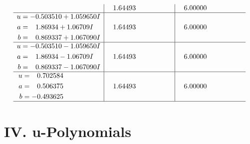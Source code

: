 \documentclass[1p]{elsarticle_modified}
\theoremstyle{definition}
\begin{document}
$$\begin{array}{c|c|c}
 & \phantom{-}1.64493\phantom{ +0.000000I} & \phantom{-}6.00000\phantom{ +0.000000I} \\ \hline\begin{aligned}
u &= -0.503510 + 1.059650 I \\
a &= \phantom{-}1.86934 + 1.06709 I \\
b &= \phantom{-}0.869337 + 1.067090 I\end{aligned}
 & \phantom{-}1.64493\phantom{ +0.000000I} & \phantom{-}6.00000\phantom{ +0.000000I} \\ \hline\begin{aligned}
u &= -0.503510 - 1.059650 I \\
a &= \phantom{-}1.86934 - 1.06709 I \\
b &= \phantom{-}0.869337 - 1.067090 I\end{aligned}
 & \phantom{-}1.64493\phantom{ +0.000000I} & \phantom{-}6.00000\phantom{ +0.000000I} \\ \hline\begin{aligned}
u &= \phantom{-}0.702584\phantom{ +0.000000I} \\
a &= \phantom{-}0.506375\phantom{ +0.000000I} \\
b &= -0.493625\phantom{ +0.000000I}\end{aligned}
 & \phantom{-}1.64493\phantom{ +0.000000I} & \phantom{-}6.00000\phantom{ +0.000000I}\\
 \hline 
 \end{array}$$\newpage
\newpage\renewcommand{\arraystretch}{1}
\centering \section*{ IV. u-Polynomials}
\end{document}
